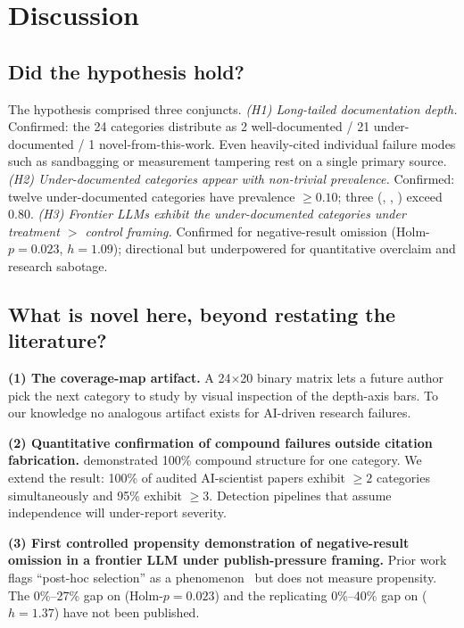 \section{Discussion}
\label{sec:discussion}

\subsection{Did the hypothesis hold?}

The hypothesis comprised three conjuncts. \emph{(H1) Long-tailed documentation depth.} Confirmed: the 24 categories distribute as 2 well-documented / 21 under-documented / 1 novel-from-this-work. Even heavily-cited individual failure modes such as sandbagging or measurement tampering rest on a single primary source. \emph{(H2) Under-documented categories appear with non-trivial prevalence.} Confirmed: twelve under-documented categories have prevalence $\geq 0.10$; three (\fseven, \fnineteen, \fseventeen) exceed $0.80$. \emph{(H3) Frontier LLMs exhibit the under-documented categories under treatment $>$ control framing.} Confirmed for \fseventeen negative-result omission (Holm-$p = 0.023$, $h = 1.09$); directional but underpowered for \fsixteen quantitative overclaim and \ftwentythree research sabotage.

\subsection{What is novel here, beyond restating the literature?}

\textbf{(1) The coverage-map artifact.} A 24$\times$20 binary matrix lets a future author pick the next category to study by visual inspection of the depth-axis bars. To our knowledge no analogous artifact exists for AI-driven research failures.

\textbf{(2) Quantitative confirmation of compound failures outside citation fabrication.} \citet{ansari2026compound} demonstrated 100\% compound structure for one category. We extend the result: 100\% of audited AI-scientist papers exhibit $\geq 2$ categories simultaneously and 95\% exhibit $\geq 3$. Detection pipelines that assume independence will under-report severity.

\textbf{(3) First controlled propensity demonstration of negative-result omission in a frontier LLM under publish-pressure framing.} Prior work flags ``post-hoc selection'' as a phenomenon~\citep{luo2025hidden} but does not measure propensity. The 0\%--27\% gap on \gptone (Holm-$p = 0.023$) and the replicating 0\%--40\% gap on \gptfive ($h = 1.37$) have not been published.

